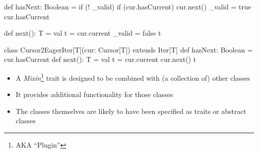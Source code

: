 \documentclass{ip3}
\begin{document}
\begin{foil}
\begin{exercise}
\begin{answer}
\begin{--code}
{         def hasNext: Boolean = {
             if (! _valid) {
                if (cur.hasCurrent) cur.next()
                _valid = true
             }
             cur.hasCurrent
         }
          
         def next(): T = {
             val t  = cur.current
             _valid = false
             t
         }
       }   
           
       class Cursor2EagerIter[T](cur: Cursor[T]) extends Iter[T] 
       { def hasNext: Boolean = cur.hasCurrent
         def next(): T = {
             val t = cur.current 
             cur.next()
             t
         } 
       }
\end{--code} 
\end{answer}
\end{exercise}
\end{foil}


\begin{foil}
\begin{itemize}
        \item A \textit{Mixin}\footnote{AKA ``Plugin''} trait is designed to be combined with (a collection of) other classes
        \item It provides additional functionality for those classes
        \item The classes themselves are likely to have been specified as traits or abstract classes                
\end{itemize}
\end{foil}
\end{document}
